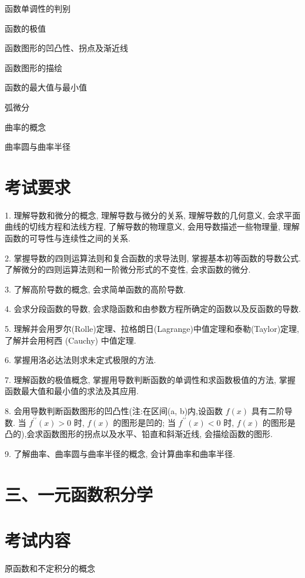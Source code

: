 \documentclass[10pt]{article}
\begin{document}
函数单调性的判别 

函数的极值 

函数图形的凹凸性、拐点及渐近线 

函数图形的描绘 

函数的最大值与最小值 

弧微分 

曲率的概念 

曲率圆与曲率半径

\section*{考试要求}

1. 理解导数和微分的概念, 理解导数与微分的关系, 理解导数的几何意义, 会求平面曲线的切线方程和法线方程, 了解导数的物理意义, 会用导数描述一些物理量, 理解函数的可导性与连续性之间的关系.

2. 掌握导数的四则运算法则和复合函数的求导法则, 掌握基本初等函数的导数公式. 了解微分的四则运算法则和一阶微分形式的不变性, 会求函数的微分.

3. 了解高阶导数的概念, 会求简单函数的高阶导数.

4. 会求分段函数的导数, 会求隐函数和由参数方程所确定的函数以及反函数的导数.

5. 理解并会用罗尔(Rolle)定理、拉格朗日(Lagrange)中值定理和泰勒(Taylor)定理,了解并会用柯西 (Cauchy) 中值定理.

6. 掌握用洛必达法则求未定式极限的方法.

7. 理解函数的极值概念, 掌握用导数判断函数的单调性和求函数极值的方法, 掌握函数最大值和最小值的求法及其应用.

8. 会用导数判断函数图形的凹凸性(注:在区间(a, b)内,设函数 \(f\left( x\right)\) 具有二阶导数. 当 \({f}^{\prime \prime }\left( x\right)  > 0\) 时, \(f\left( x\right)\) 的图形是凹的; 当 \({f}^{\prime \prime }\left( x\right)  < 0\) 时, \(f\left( x\right)\) 的图形是凸的),会求函数图形的拐点以及水平、铅直和斜渐近线, 会描绘函数的图形.

9. 了解曲率、曲率圆与曲率半径的概念, 会计算曲率和曲率半径.

\section*{三、一元函数积分学}

\section*{考试内容}

原函数和不定积分的概念 
\end{document}
